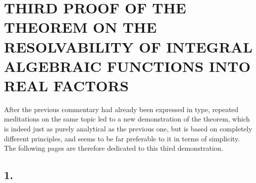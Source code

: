 \documentclass[12pt]{memoir}
\theoremstyle{plain}
\theoremstyle{remark}
\begin{document}
\section*{THIRD PROOF OF THE THEOREM ON THE RESOLVABILITY
OF INTEGRAL ALGEBRAIC FUNCTIONS INTO REAL FACTORS}

After the previous commentary had already been expressed in type, repeated meditations on the same topic led to a new demonstration of the theorem, which is indeed just as purely analytical as the previous one, but is based on completely different principles, and seems to be far preferable to it in terms of simplicity. The following pages are therefore dedicated to this third demonstration.

\subsection*{1.}
\end{document}

